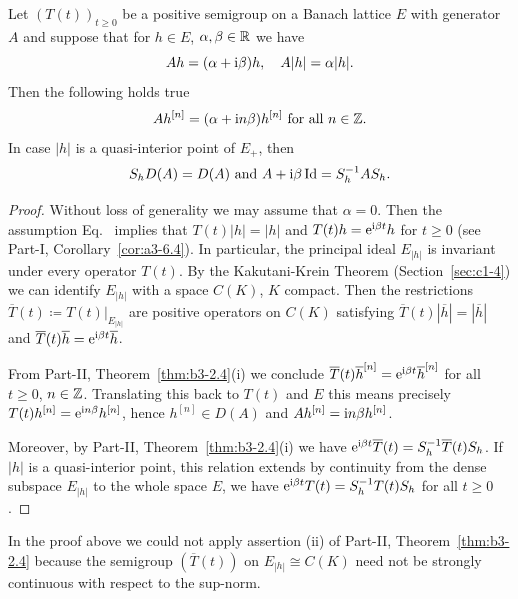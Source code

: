 \begin{theorem}\label{thm:c3-2.2}
	Let $(T(t))_{t\geq 0}$ be a positive semigroup on a Banach lattice $E$ with generator $A$ and suppose that for $h \in E$, $\alpha,\beta \in \mathbb{R} $ we have
	\begin{equation}\label{eq:c3-2.6}
		Ah = (\alpha+\mathrm{i}\beta )h, \quad A|h| = \alpha|h|.
	\end{equation}
Then the following holds true
\begin{equation}\label{eq:c3-2.7}
	Ah^{[n]} = (\alpha+\mathrm{i} n\beta)h^{[n]} \text{ for all } n \in \mathbb{Z} .
\end{equation}
In case $|h|$ is a quasi-interior point of\/ $E_{+}$, then
\[
S_{h}D(A) = D(A) \text{ and } A + \mathrm{i}\beta \operatorname{Id} = S_{h}^{-1}AS_{h} .
\]
\end{theorem}
\begin{proof}
	Without loss of generality we may assume that $\alpha = 0$.
	Then the assumption Eq.~ implies that $T(t)|h| = |h|$ and $T(t)h = \mathrm{e}^{\mathrm{i}\beta t}h$ for $t \geq 0$ (see Part-I, Corollary~\ref{cor:a3-6.4}).
	In particular, the principal ideal $E_{|h|}$ is invariant under every operator $T(t)$.
	By the Kakutani-Krein Theorem (Section~\ref{sec:c1-4}) we can identify $E_{|h|}$ with a space $C(K)$, $K$ compact.
	Then the restrictions $\overline{T}(t) \coloneq T(t)|_{E_{|h|}}$ are positive operators on $C(K)$ satisfying $\overline{T}(t)|\overline{h}| = |\overline{h}|$ and $\overline{T}(t)\overline{h} = \mathrm{e}^{\mathrm{i}\beta  t}\overline{h}$.
	
	From Part-II, Theorem~\ref{thm:b3-2.4}(i) we conclude $\overline{T}(t)\overline{h}^{[n]} = \mathrm{e}^{\mathrm{i}\beta  t}\overline{h}^{[n]}$ for all $t \geq 0$, $n \in \mathbb{Z}$.
	Translating this back to $T(t)$ and $E$ this means precisely $T(t)h^{[n]} = \mathrm{e}^{\mathrm{i} n\beta}h^{[n]}$, hence $h^{[n]} \in D(A)$ and $Ah^{[n]} = \mathrm{i}  n\beta h^{[n]}$.
	
	Moreover, by Part-II, Theorem~\ref{thm:b3-2.4}(i) we have $\mathrm{e}^{\mathrm{i}\beta  t}\overline{T}(t) = S_{h}^{-1}\overline{T}(t)S_{h}$.
	If\/ $|h|$ is a quasi-interior point, this relation extends by continuity from the dense subspace $E_{|h|}$ to the whole space $E$, \ie  we have $\mathrm{e}^{\mathrm{i}\beta  t}T(t) = S_{h}^{-1}T(t)S_{h}$ for all $t \geq 0$.
\end{proof}
In the proof above we could not apply assertion (ii) of Part-II, Theorem~\ref{thm:b3-2.4} because the semigroup $(\overline{T}(t))$ on $E_{|h|} \cong C(K)$ need not be strongly continuous with respect to the sup-norm.

